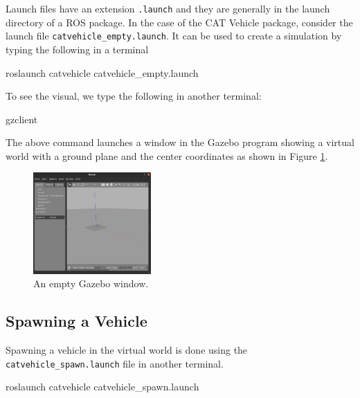 \documentclass[
]{article}
\newenvironment{Shaded}{\begin{snugshade}}{\end{snugshade}}
\newcommand{\ExtensionTok}[1]{#1}
\newcommand{\NormalTok}[1]{#1}
\begin{document}
Launch files have an extension \texttt{.launch} and they are generally
in the launch directory of a ROS package. In the case of the CAT Vehicle
package, consider the launch file \texttt{catvehicle\_empty.launch}. It
can be used to create a simulation by typing the following in a terminal

\begin{Shaded}
\begin{Highlighting}[]
\ExtensionTok{roslaunch}\NormalTok{ catvehicle catvehicle\_empty.launch}
\end{Highlighting}
\end{Shaded}

To see the visual, we type the following in another terminal:

\begin{Shaded}
\begin{Highlighting}[]
\ExtensionTok{gzclient}
\end{Highlighting}
\end{Shaded}

The above command launches a window in the Gazebo program showing a
virtual world with a ground plane and the center coordinates as shown in
Figure \ref{fig:Gazebo_002.png}.

\begin{figure}[htbp]
\centering
\includegraphics[width=0.4\textwidth]{Gazebo_002.png}
\caption{An empty Gazebo window.}
\label{fig:Gazebo_002.png}
\end{figure}

\hypertarget{spawning-a-vehicle}{%
\subsection{Spawning a Vehicle}\label{spawning-a-vehicle}}

Spawning a vehicle in the virtual world is done using the
\texttt{catvehicle\_spawn.launch} file in another terminal.

\begin{Shaded}
\begin{Highlighting}[]
\ExtensionTok{roslaunch}\NormalTok{ catvehicle catvehicle\_spawn.launch}
\end{Highlighting}
\end{Shaded}
\end{document}
